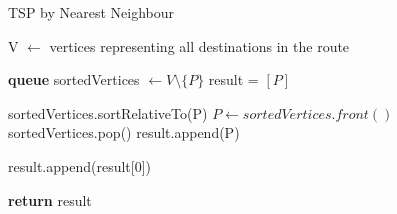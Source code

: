 \documentclass{article}
\begin{document}
\begin{algorithm}[h]
\caption{TSP by Nearest Neighbour}
\begin{algorithmic}[1]

\State V $\gets$ vertices representing all destinations in the route


\State \textbf{queue} sortedVertices $\gets V \setminus \{P\}$
\State result = $[P]$

	\State sortedVertices.sortRelativeTo(P)
	\State $P \gets sortedVertices.front()$
	\State sortedVertices.pop()
	\State result.append(P)
\EndWhile

\State result.append(result[0])

\State \textbf{return} result
\EndProcedure

\end{algorithmic}
\end{algorithm}
\end{document}
